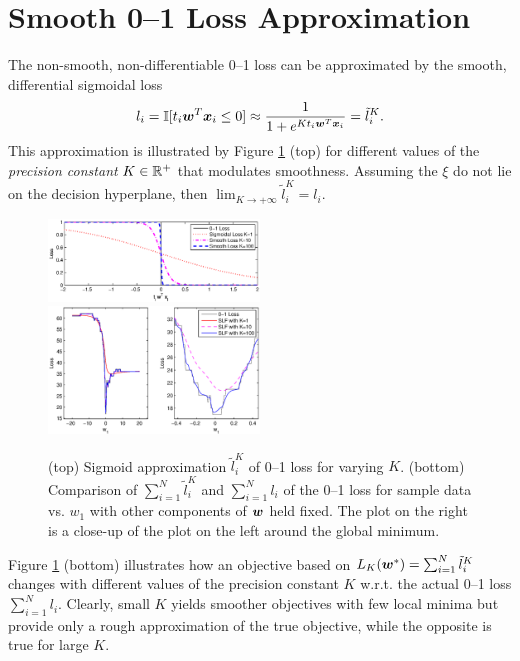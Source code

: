 \section{Smooth 0--1 Loss Approximation}
\label{cha:Smoothlossapprox}

The non-smooth, non-differentiable 0--1 loss can be
approximated by the smooth, differential sigmoidal loss 
$$l_i = \mathbb{I} [t_i \boldsymbol{w}^T \boldsymbol{x}_i \leq 0] \approx \frac{1}{1 + e^{Kt_i \boldsymbol{w}^T \boldsymbol{x}_i }} = \tilde{l}_i^K.$$
This approximation is illustrated by Figure \ref{fig:sla.smooth} (top) for different
values of the \emph{precision constant} $K \in \mathbb{R}^+$ that modulates smoothness.
Assuming the $\xi$ do not lie
on the decision hyperplane, then $\lim_{K \rightarrow +\infty} \tilde{l}_i^K = l_i$.

\begin{figure}[tp!]
\hspace{-3mm} \includegraphics[width=0.50\textwidth]{images/fig52_smooth.eps}
\vspace{-4mm} \hspace{-3mm} \includegraphics[width=0.50\textwidth]{images/fig53_smoothfunction.eps}
\vspace{-1mm}
\caption{ \footnotesize (top) Sigmoid approximation $\tilde{l}_i^K$ of
  0--1 loss for varying $K$.  (bottom) Comparison of $\sum_{i=1}^N
  \tilde{l}_i^K$ and $\sum_{i=1}^N l_i$ of the 0--1 loss for sample
  data vs. $w_1$ with other components of $\boldsymbol{w}$ held fixed.  The plot
  on the right is a close-up of the plot on the left around the global
  minimum.}
\label{fig:sla.smooth}
\vspace{-4mm}
\end{figure}

Figure \ref{fig:sla.smooth} (bottom) illustrates how an objective
based on $L_K(\boldsymbol{w}^*) = \sum_{i=1}^N \tilde{l}_i^K$ changes with
different values of the precision constant $K$ w.r.t. the actual 0--1
loss $\sum_{i=1}^N l_i$.  Clearly, small $K$ yields smoother
objectives with few local minima but provide only a rough
approximation of the true objective, while the opposite is true for
large $K$.

